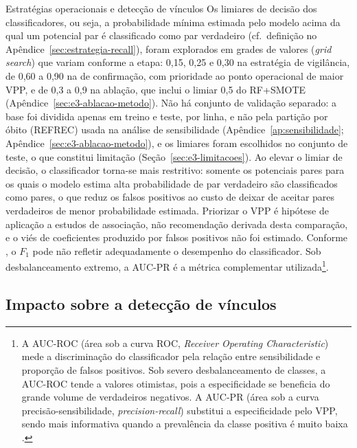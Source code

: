 \begin{chapter}{Estratégias operacionais e detecção de vínculos}
Os limiares de decisão dos classificadores, ou seja, a probabilidade mínima estimada pelo modelo acima da qual um potencial par é classificado como par verdadeiro (cf.\ definição no Apêndice~\ref{sec:estrategia-recall}), foram explorados em grades de valores (\textit{grid search}) que variam conforme a etapa: 0{,}15, 0{,}25 e 0{,}30 na estratégia de vigilância, de 0{,}60 a 0{,}90 na de confirmação, com prioridade ao ponto operacional de maior VPP, e de 0{,}3 a 0{,}9 na ablação, que inclui o limiar 0{,}5 do RF+SMOTE (Apêndice~\ref{sec:e3-ablacao-metodo}). Não há conjunto de validação separado: a base foi dividida apenas em treino e teste, por linha, e não pela partição por óbito (REFREC) usada na análise de sensibilidade (Apêndice~\ref{ap:sensibilidade}; Apêndice~\ref{sec:e3-ablacao-metodo}), e os limiares foram escolhidos no conjunto de teste, o que constitui limitação (Seção~\ref{sec:e3-limitacoes}). Ao elevar o limiar de decisão, o classificador torna-se mais restritivo: somente os potenciais pares para os quais o modelo estima alta probabilidade de par verdadeiro são classificados como pares, o que reduz os falsos positivos ao custo de deixar de aceitar pares verdadeiros de menor probabilidade estimada. Priorizar o VPP é hipótese de aplicação a estudos de associação, não recomendação derivada desta comparação, e o viés de coeficientes produzido por falsos positivos não foi estimado. Conforme , o $F_1$ pode não refletir adequadamente o desempenho do classificador. Sob desbalanceamento extremo, a AUC-PR é a métrica complementar utilizada\footnote{A AUC-ROC (área sob a curva ROC, \textit{Receiver Operating Characteristic}) mede a discriminação do classificador pela relação entre sensibilidade e proporção de falsos positivos. Sob severo desbalanceamento de classes, a AUC-ROC tende a valores otimistas, pois a especificidade se beneficia do grande volume de verdadeiros negativos. A AUC-PR (área sob a curva precisão-sensibilidade, \textit{precision-recall}) substitui a especificidade pelo VPP, sendo mais informativa quando a prevalência da classe positiva é muito baixa \cite{Davis2006aucpr, Saito2015aucpr}.}.

\subsection{Impacto sobre a detecção de vínculos}\label{sec:e3-impacto-metodo}


\end{chapter}
